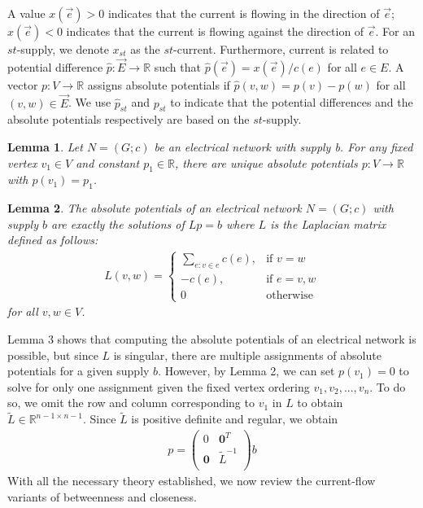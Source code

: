 \documentclass[10pt]{siamltex}
\newtheorem{mylem}{Lemma}
\begin{document}
\begin{pagewiselinenumbers}
A value $x(\vec{e}) > 0$ indicates that the current is flowing in the direction of $\vec{e}$; $x(\vec{e}) < 0$ indicates that the current is flowing against the direction of $\vec{e}$. For an $st$-supply, we denote $x_{st}$ as the $st$-current. Furthermore, current is related to potential difference $\hat{p}: \vec{E} \rightarrow \mathbb{R}$ such that $\hat{p}(\vec{e}) = x(\vec{e})/c(e)$ for all $e \in E$. A vector $p: V \rightarrow \mathbb{R}$ assigns absolute potentials if $\hat{p}(v,w) = p(v) - p(w)$ for all $(v,w) \in \vec{E}$. We use $\hat{p}_{st}$ and $p_{st}$ to indicate that the potential differences and the absolute potentials respectively are based on the $st$-supply.
\vspace{5mm}
\begin{mylem}
Let $N = (G;c)$ be an electrical network with supply b. For any fixed vertex $v_1 \in V$ and constant $p_1 \in \mathbb{R}$, there are unique absolute potentials $p: V \rightarrow \mathbb{R}$ with $p(v_1) = p_1$.
\end{mylem}
\vspace{5mm}
\begin{mylem}
The absolute potentials of an electrical network $N = (G;c)$ with supply $b$ are exactly the solutions of $Lp=b$ where $L$ is the Laplacian matrix defined as follows:
\begin{align}
     L(v,w)=
\begin{cases}
\sum_{e: v \in e} c(e), & \text{if }v=w 
\\
-c(e), & \text{if }e={v,w}
\\
0 & \text{otherwise}
\end{cases}
\end{align}
for all $v,w \in V$.
\end{mylem}
\vspace{5mm}

Lemma 3 shows that computing the absolute potentials of an electrical network is possible, but since $L$ is singular, there are multiple assignments of absolute potentials for a given supply $b$. However, by Lemma 2, we can set $p(v_1) = 0$ to solve for only one assignment given the fixed vertex ordering $v_1, v_2, ..., v_n$. To do so, we omit the row and column corresponding to $v_1$ in $L$ to obtain $\widetilde{L} \in \mathbb{R}^{n-1 \times n-1}$. Since $\widetilde{L}$ is positive definite and regular, we obtain
\begin{align}
\label{lp_equation}
     p = \left( \begin{array}{cc}
0 & \mathbf{0}^T \\
\mathbf{0} & \widetilde{L}^{-1} \\
\end{array} \right) b
     \end{align}
     \vspace{5mm}
     With all the necessary theory established, we now review the current-flow variants of betweenness and closeness.

\end{pagewiselinenumbers}
\end{document}

